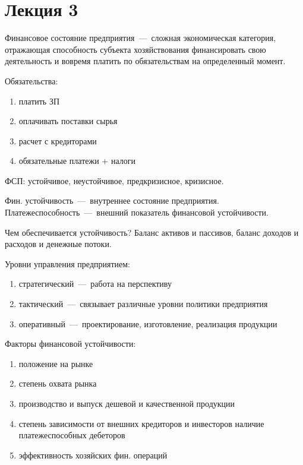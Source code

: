 \documentclass[14pt]{extarticle}
\begin{document}
\title{}
\maketitle

\section{Лекция 3}

Финансовое состояние предприятия~---~сложная экономическая категория, отражающая способность субъекта хозяйствования финансировать свою деятельность и вовремя платить по обязательствам на определенный момент.

Обязательства:

\begin{enumerate}
	\item платить ЗП
	\item оплачивать поставки сырья
	\item расчет с кредиторами
	\item обязательные платежи + налоги
\end{enumerate}

ФСП: устойчивое, неустойчивое, предкризисное, кризисное.

Фин. устойчивость~---~внутреннее состояние предприятия. Платежеспособность~---~внешний показатель финансовой устойчивости.

Чем обеспечивается устойчивость? Баланс активов и пассивов, баланс доходов и расходов и денежные потоки.

Уровни управления предприятием:

\begin{enumerate}
	\item стратегический~---~работа на перспективу
	\item тактический~---~связывает различные уровни политики предприятия 
	\item оперативный~---~проектирование, изготовление, реализация продукции
\end{enumerate}

Факторы финансовой устойчивости:

\begin{enumerate}
	\item положение на рынке
	\item степень охвата рынка
	\item производство и выпуск дешевой и качественной продукции
	\item степень зависимости от внешних кредиторов и инвесторов наличие платежеспособных дебеторов
	\item эффективность хозяйских фин. операций
\end{enumerate}
\end{document}
